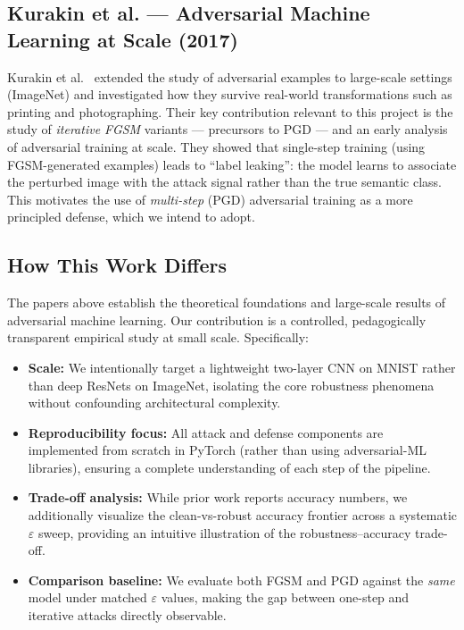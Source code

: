 \documentclass[conference]{IEEEtran}
\begin{document}
\subsection{Kurakin et al. — Adversarial Machine Learning at Scale (2017)}

Kurakin et al.~\cite{kurakin2017scale} extended the study of adversarial
examples to large-scale settings (ImageNet) and investigated how they
survive real-world transformations such as printing and photographing.
Their key contribution relevant to this project is the study of
\emph{iterative FGSM} variants — precursors to PGD — and an early analysis
of adversarial training at scale. They showed that single-step training
(using FGSM-generated examples) leads to ``label leaking'': the model
learns to associate the perturbed image with the attack signal rather than
the true semantic class. This motivates the use of \emph{multi-step} (PGD)
adversarial training as a more principled defense, which we intend to adopt.

\subsection{How This Work Differs}

The papers above establish the theoretical foundations and large-scale
results of adversarial machine learning. Our contribution is a controlled,
pedagogically transparent empirical study at small scale. Specifically:

\begin{itemize}
    \item \textbf{Scale:} We intentionally target a lightweight two-layer
          CNN on MNIST rather than deep ResNets on ImageNet, isolating the
          core robustness phenomena without confounding architectural
          complexity.

    \item \textbf{Reproducibility focus:} All attack and defense components
          are implemented from scratch in PyTorch (rather than using
          adversarial-ML libraries), ensuring a complete understanding of
          each step of the pipeline.

    \item \textbf{Trade-off analysis:} While prior work reports accuracy
          numbers, we additionally visualize the clean-vs-robust accuracy
          frontier across a systematic $\varepsilon$ sweep, providing an
          intuitive illustration of the robustness–accuracy trade-off.

    \item \textbf{Comparison baseline:} We evaluate both FGSM and PGD
          against the \emph{same} model under matched $\varepsilon$ values,
          making the gap between one-step and iterative attacks directly
          observable.
\end{itemize}
\end{document}
